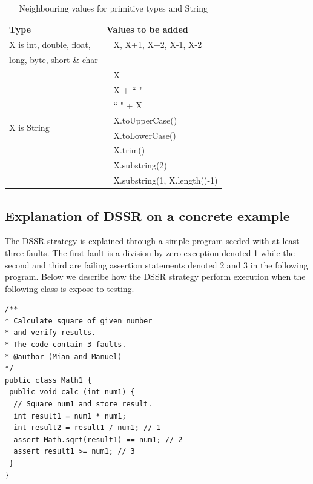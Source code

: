 \documentclass{acm_proc_article-sp}
\begin{document}
\begin{table}[ht]
\caption{Neighbouring values for primitive types and String} %
\centering %
\begin{tabular}{| l | l |} %
\hline\hline %
Type & Values to be added\\ [0.5ex] %
\hline %
\multirow{1}{*}{X is int, double, float, } & ~ X,  X+1, X+2, X-1, X-2 \\ %
\multirow{1}{*}{long, byte, short \& char} &  \\ 

\hline
\multirow{8}{*}{X is String} & ~ X\\ %

& ~ X + ``  "\\ %
& ~ ``  " + X \\ %
& ~ X.toUpperCase() \\
& ~ X.toLowerCase() \\
& ~ X.trim() \\
& ~ X.substring(2) \\
& ~ X.substring(1, X.length()-1) \\[1ex]
\hline
\hline %
\end{tabular}
\bigskip
\label{table:addvalues} %
\end{table}







\subsection{Explanation of DSSR on a concrete example}
The DSSR strategy is explained through a simple program seeded with at least three faults. The first fault is a division by zero exception denoted 1 while the second and third are failing assertion statements denoted 2 and 3 in the following program.  Below we describe how the DSSR strategy perform execution when the following class is expose to testing.

\begin{lstlisting}
/** 
* Calculate square of given number 
* and verify results. 
* The code contain 3 faults.
* @author (Mian and Manuel)
*/
public class Math1 {
 public void calc (int num1) {
  // Square num1 and store result. 
  int result1 = num1 * num1;
  int result2 = result1 / num1; // 1
  assert Math.sqrt(result1) == num1; // 2
  assert result1 >= num1; // 3
 } 
}
\end{lstlisting}
\end{document}

